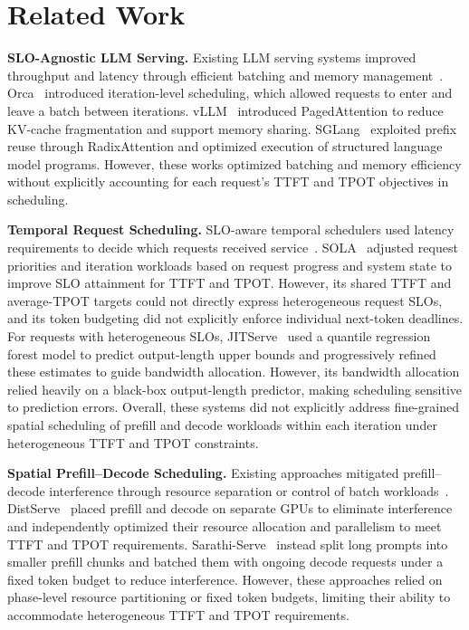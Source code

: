 \section{Related Work}
\label{sec:related-work}

\textbf{SLO-Agnostic LLM Serving.}
Existing LLM serving systems improved throughput and latency through efficient batching and memory management~\cite{sheng2024slora,shi2026elora,prabhu2025vattention}.
Orca~\cite{yu2022orca} introduced iteration-level scheduling, which allowed requests to enter and leave a batch between iterations.
vLLM~\cite{kwon2023vllm} introduced PagedAttention to reduce KV-cache fragmentation and support memory sharing.
SGLang~\cite{zheng2024sglang} exploited prefix reuse through RadixAttention and optimized execution of structured language model programs.
However, these works optimized batching and memory efficiency without explicitly accounting for each request's TTFT and TPOT objectives in scheduling.

\textbf{Temporal Request Scheduling.}
SLO-aware temporal schedulers used latency requirements to decide which requests received service~\cite{sun2024llumnix,goel2026qoserve}.
SOLA~\cite{hong2025sola} adjusted request priorities and iteration workloads based on request progress and system state to improve SLO attainment for TTFT and TPOT.
However, its shared TTFT and average-TPOT targets could not directly express heterogeneous request SLOs, and its token budgeting did not explicitly enforce individual next-token deadlines.
For requests with heterogeneous SLOs, JITServe~\cite{zhang2026jitserve} used a quantile regression forest model to predict output-length upper bounds and progressively refined these estimates to guide bandwidth allocation.
However, its bandwidth allocation relied heavily on a black-box output-length predictor, making scheduling sensitive to prediction errors. Overall, these systems did not explicitly address fine-grained spatial scheduling of prefill and decode workloads within each iteration under heterogeneous TTFT and TPOT constraints.



\textbf{Spatial Prefill--Decode Scheduling.}
Existing approaches mitigated prefill--decode interference through resource separation or control of batch workloads~\cite{patel2024splitwise,qin2025mooncake}.
DistServe~\cite{zhong2024distserve} placed prefill and decode on separate GPUs to eliminate interference and independently optimized their resource allocation and parallelism to meet TTFT and TPOT requirements.
Sarathi-Serve~\cite{agrawal2024sarathi} instead split long prompts into smaller prefill chunks and batched them with ongoing decode requests under a fixed token budget to reduce interference.
However, these approaches relied on phase-level resource partitioning or fixed token budgets, limiting their ability to accommodate heterogeneous TTFT and TPOT requirements.
